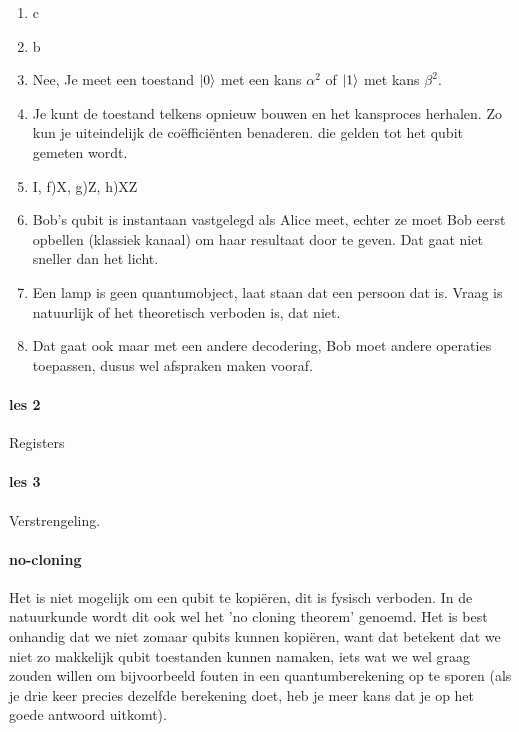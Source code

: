 \documentclass[../../main.tex]{subfiles}
\begin{document}
\begin{enumerate}[wide, labelwidth=!, labelindent=0pt]
\item c
\item b
\item Nee, Je meet een toestand $\ket{0}$ met een kans $\alpha^2$ of $\ket{1}$ met kans $\beta^2$.
\item Je kunt de toestand telkens opnieuw bouwen en het kansproces herhalen. Zo kun je uiteindelijk de co\"effici\"enten benaderen. die gelden tot het qubit gemeten wordt.

\item I, f)X, g)Z, h)XZ


\item Bob's qubit is instantaan vastgelegd als Alice meet, echter ze moet Bob eerst opbellen (klassiek kanaal) om haar resultaat door te geven. Dat gaat niet sneller dan het licht.
\item Een lamp is geen quantumobject,  laat staan dat een persoon dat is.  Vraag is natuurlijk of het theoretisch verboden is, dat niet.
\item Dat gaat ook maar met een andere decodering, Bob moet andere operaties toepassen, dusus wel afspraken maken vooraf.
\end{enumerate}



\iffalse%


\paragraph*{les 2}Registers
\paragraph*{les 3} Verstrengeling.

\paragraph*{no-cloning}\label{sec:nocloning}

Het is niet mogelijk om een qubit te kopi\"eren, dit is fysisch verboden. In de natuurkunde wordt dit ook wel het 'no cloning theorem' genoemd. Het is best onhandig dat we niet zomaar qubits kunnen kopi\"eren, want dat betekent dat we niet zo makkelijk qubit toestanden kunnen namaken, iets wat we wel graag zouden willen om bijvoorbeeld fouten in een quantumberekening op te sporen (als je drie keer precies dezelfde berekening doet, heb je meer kans dat je op het goede antwoord uitkomt).
\end{document}

